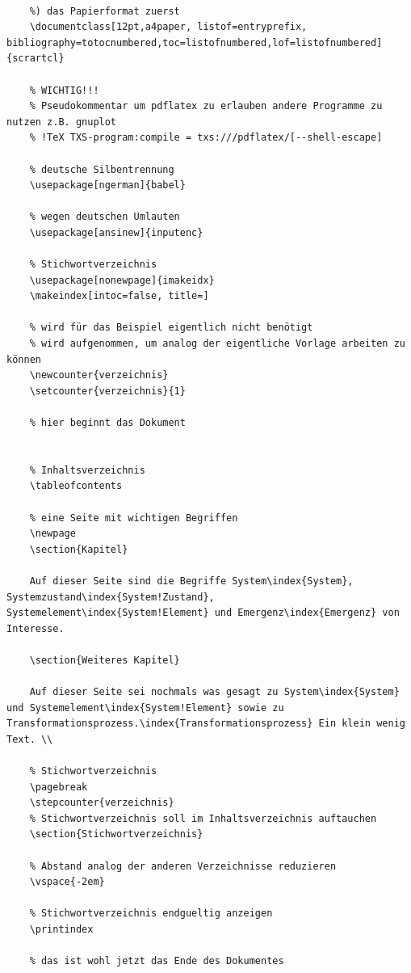 \begin{lstlisting}[caption= Beispielprogramm., label=lst:beispielprogramm]
    % !TeX document-id = {acd94374-0a5a-4c39-a15c-8f2e56f0151a}
    
    %) das Papierformat zuerst
    \documentclass[12pt,a4paper, listof=entryprefix, bibliography=totocnumbered,toc=listofnumbered,lof=listofnumbered]{scrartcl}
    
    % WICHTIG!!!
    % Pseudokommentar um pdflatex zu erlauben andere Programme zu nutzen z.B. gnuplot
    % !TeX TXS-program:compile = txs:///pdflatex/[--shell-escape]
    
    % deutsche Silbentrennung
    \usepackage[ngerman]{babel}
    
    % wegen deutschen Umlauten
    \usepackage[ansinew]{inputenc}
    
    % Stichwortverzeichnis
    \usepackage[nonewpage]{imakeidx}
    \makeindex[intoc=false, title=]
    
    % wird für das Beispiel eigentlich nicht benötigt
    % wird aufgenommen, um analog der eigentliche Vorlage arbeiten zu können
    \newcounter{verzeichnis}
    \setcounter{verzeichnis}{1}
    
    % hier beginnt das Dokument
    
    
    % Inhaltsverzeichnis
    \tableofcontents
    
    % eine Seite mit wichtigen Begriffen
    \newpage
    \section{Kapitel}
    
    Auf dieser Seite sind die Begriffe System\index{System}, Systemzustand\index{System!Zustand}, Systemelement\index{System!Element} und Emergenz\index{Emergenz} von Interesse.
    
    \section{Weiteres Kapitel}
    
    Auf dieser Seite sei nochmals was gesagt zu System\index{System} und Systemelement\index{System!Element} sowie zu Transformationsprozess.\index{Transformationsprozess} Ein klein wenig Text. \\
    
    % Stichwortverzeichnis
    \pagebreak
    \stepcounter{verzeichnis}
    % Stichwortverzeichnis soll im Inhaltsverzeichnis auftauchen
    \section{Stichwortverzeichnis}
    
    % Abstand analog der anderen Verzeichnisse reduzieren
    \vspace{-2em}
    
    % Stichwortverzeichnis endgueltig anzeigen
    \printindex
    
    % das ist wohl jetzt das Ende des Dokumentes
    
\end{lstlisting}

